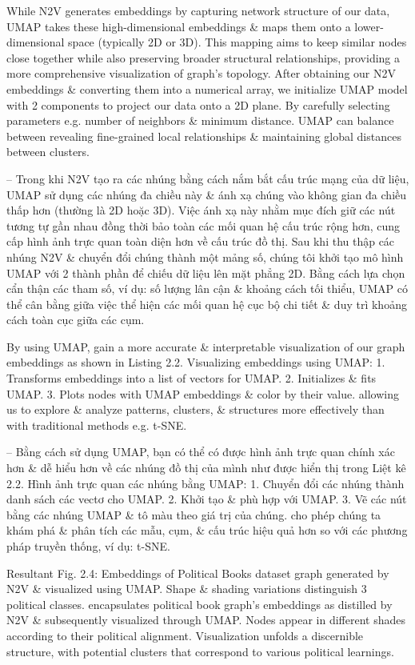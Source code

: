 \documentclass{article}
\begin{document}
\begin{itemize}
\begin{itemize}
\begin{itemize}
           While N2V generates embeddings by capturing network structure of our data, UMAP takes these high-dimensional embeddings \& maps them onto a lower-dimensional space (typically 2D or 3D). This mapping aims to keep similar nodes close together while also preserving broader structural relationships, providing a more comprehensive visualization of graph's topology. After obtaining our N2V embeddings \& converting them into a numerical array, we initialize UMAP model with 2 components to project our data onto a 2D plane. By carefully selecting parameters e.g. number of neighbors \& minimum distance. UMAP can balance between revealing fine-grained local relationships \& maintaining global distances between clusters.

           -- Trong khi N2V tạo ra các nhúng bằng cách nắm bắt cấu trúc mạng của dữ liệu, UMAP sử dụng các nhúng đa chiều này \& ánh xạ chúng vào không gian đa chiều thấp hơn (thường là 2D hoặc 3D). Việc ánh xạ này nhằm mục đích giữ các nút tương tự gần nhau đồng thời bảo toàn các mối quan hệ cấu trúc rộng hơn, cung cấp hình ảnh trực quan toàn diện hơn về cấu trúc đồ thị. Sau khi thu thập các nhúng N2V \& chuyển đổi chúng thành một mảng số, chúng tôi khởi tạo mô hình UMAP với 2 thành phần để chiếu dữ liệu lên mặt phẳng 2D. Bằng cách lựa chọn cẩn thận các tham số, ví dụ: số lượng lân cận \& khoảng cách tối thiểu, UMAP có thể cân bằng giữa việc thể hiện các mối quan hệ cục bộ chi tiết \& duy trì khoảng cách toàn cục giữa các cụm.

           By using UMAP, gain a more accurate \& interpretable visualization of our graph embeddings as shown in {\sf Listing 2.2. Visualizing embeddings using UMAP: 1. Transforms embeddings into a list of vectors for UMAP. 2. Initializes \& fits UMAP. 3. Plots nodes with UMAP embeddings \& color by their value.} allowing us to explore \& analyze patterns, clusters, \& structures more effectively than with traditional methods e.g. t-SNE.

           -- Bằng cách sử dụng UMAP, bạn có thể có được hình ảnh trực quan chính xác hơn \& dễ hiểu hơn về các nhúng đồ thị của mình như được hiển thị trong {\sf Liệt kê 2.2. Hình ảnh trực quan các nhúng bằng UMAP: 1. Chuyển đổi các nhúng thành danh sách các vectơ cho UMAP. 2. Khởi tạo \& phù hợp với UMAP. 3. Vẽ các nút bằng các nhúng UMAP \& tô màu theo giá trị của chúng.} cho phép chúng ta khám phá \& phân tích các mẫu, cụm, \& cấu trúc hiệu quả hơn so với các phương pháp truyền thống, ví dụ: t-SNE.

           Resultant {\sf Fig. 2.4: Embeddings of Political Books dataset graph generated by N2V \& visualized using UMAP. Shape \& shading variations distinguish 3 political classes.} encapsulates political book graph's embeddings as distilled by N2V \& subsequently visualized through UMAP. Nodes appear in different shades according to their political alignment. Visualization unfolds a discernible structure, with potential clusters that correspond to various political learnings.


\end{itemize}
\end{itemize}
\end{itemize}
\end{document}
